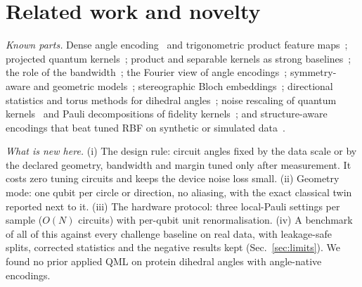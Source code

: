 \documentclass[aps,pra,reprint,superscriptaddress,nofootinbib,longbibliography]{revtex4-2}
\newcommand{\code}[1]{\texttt{#1}}
\begin{document}
\begin{table}[t]
\centering
\caption{Benchmark targets BT-1 to BT-10 as evaluated by \code{qlassifier benchmark} (\code{targets.json}).}
\label{tab:targets}
{\small}
\end{table}

\section{Related work and novelty}
\label{sec:related}

\textit{Known parts.} Dense angle encoding~\cite{larose2020robust} and trigonometric product feature
maps~\cite{stoudenmire2016supervised}; projected quantum kernels~\cite{huang2020power}; product and separable kernels as
strong baselines~\cite{bowles2024better,shin2025new}; the role of the bandwidth~\cite{shaydulin2021importance,%
canatar2022bandwidth,egginger2023a,florezablan2025on}; the Fourier view of angle
encodings~\cite{schuld2020the,repetto2026expressivity}; symmetry-aware and geometric
models~\cite{glick2021covariant,meyer2022exploiting,ragone2022representation,li2024enforcing}; stereographic Bloch
embeddings~\cite{jasso2023quantum}; directional statistics and torus methods for dihedral
angles~\cite{sra2016directional,pewsey2020recent,eltzner2015torus,wiechers2021clustering}; noise rescaling of quantum
kernels~\cite{haug2021quantum,hubregtsen2021training} and Pauli decompositions of fidelity kernels~\cite{gan2023a}; and
structure-aware encodings that beat tuned RBF on
synthetic or simulated data~\cite{wang2026structured,frohnert2026taskaligned}.

\textit{What is new here.} (i) The design rule: circuit angles fixed by the data scale or by the declared geometry,
bandwidth and margin tuned only after measurement. It costs zero tuning circuits and keeps the device noise loss small.
(ii) Geometry mode: one qubit per circle or direction, no aliasing, with the exact classical twin
reported next to it. (iii) The hardware protocol: three local-Pauli settings per sample ($O(N)$ circuits) with
per-qubit unit renormalisation. (iv) A benchmark of all of this against every challenge baseline on real data, with
leakage-safe splits, corrected statistics and the negative results kept (Sec.~\ref{sec:limits}). We found no prior
applied QML on protein dihedral angles with angle-native encodings.

\end{document}
